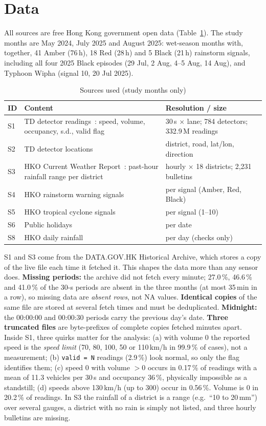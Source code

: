 \documentclass[conference]{IEEEtran}
\begin{document}
\section{Data}
All sources are free Hong Kong government open data (Table~\ref{tab:sources}). The study
months are May 2024, July 2025 and August 2025: wet-season months with, together, 41 Amber
(76\,h), 18 Red (28\,h) and 5 Black (21\,h) rainstorm signals, including all four 2025 Black
episodes (29 Jul, 2 Aug, 4--5 Aug, 14 Aug), and Typhoon Wipha (signal 10, 20 Jul 2025).

\begin{table}[t]
\centering
\caption{Sources used (study months only)}
\label{tab:sources}
\footnotesize
\begin{tabular}{@{}p{0.6cm}p{3.4cm}p{3.2cm}@{}}
\toprule
ID & Content & Resolution / size \\
\midrule
S1 & TD detector readings~\cite{td_detectors}: speed, volume, occupancy, s.d., valid flag & 30\,s $\times$ lane; 784 detectors; 332.9\,M readings \\
S2 & TD detector locations & district, road, lat/lon, direction \\
S3 & HKO Current Weather Report~\cite{hko_weather}: past-hour rainfall range per district & hourly $\times$ 18 districts; 2,231 bulletins \\
S4 & HKO rainstorm warning signals~\cite{hko_warndb} & per signal (Amber, Red, Black) \\
S5 & HKO tropical cyclone signals~\cite{hko_warndb} & per signal (1--10) \\
S6 & Public holidays & per date \\
S8 & HKO daily rainfall & per day (checks only) \\
\bottomrule
\end{tabular}
\end{table}

S1 and S3 come from the DATA.GOV.HK Historical Archive, which stores a copy of the live file
each time it fetched it. This shapes the data more than any sensor does. \textbf{Missing
periods:} the archive did not fetch every minute; 27.0\,\%, 46.6\,\% and 41.0\,\% of the 30-s
periods are absent in the three months (at most 35\,min in a row), so missing data are
\emph{absent rows}, not NA values. \textbf{Identical copies} of the same file are stored at
several fetch times and must be deduplicated. \textbf{Midnight:} the 00:00:00 and 00:00:30
periods carry the previous day's date. \textbf{Three truncated files} are byte-prefixes of
complete copies fetched minutes apart. Inside S1, three quirks matter for the analysis:
(a) with volume 0 the reported speed is the \emph{speed limit} (70, 80, 100, 50 or 110\,km/h
in 99.9\,\% of cases), not a measurement; (b) \texttt{valid = N} readings (2.9\,\%) look normal,
so only the flag identifies them; (c) speed 0 with volume $>0$ occurs in 0.17\,\% of readings
with a mean of 11.3 vehicles per 30\,s and occupancy 36\,\%, physically impossible as a
standstill; (d) speeds above 130\,km/h (up to 300) occur in 0.56\,\%. Volume is 0 in
20.2\,\% of readings. In S3 the rainfall of a district is a range (e.g.\ ``10 to 20\,mm'') over several
gauges, a district with no rain is simply not listed, and three hourly bulletins are missing.
\end{document}
